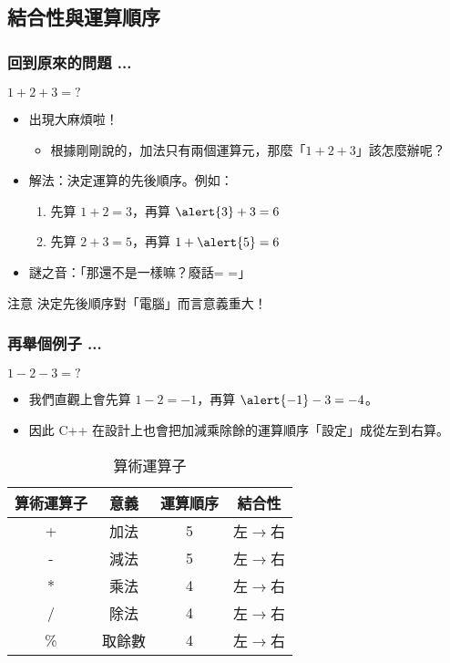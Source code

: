 \documentclass[utf8]{beamer}
\begin{document}
\begin{CJK}{UTF8}{bkai}
\subsection{結合性與運算順序}

\begin{frame}
  \frametitle{回到原來的問題 ...}
  \begin{exampleblock}{$1+2+3=?$}
    \begin{itemize}
    \item \alert{出現大麻煩啦！}
      \begin{itemize}[<2->]
        \item 根據剛剛說的，加法只有兩個運算元，那麼「$1+2+3$」該怎麼辦呢？
      \end{itemize}
    \item<3-> 解法：決定運算的先後順序。例如：
      \begin{enumerate}
        \item<4-> 先算 $1+2=3$，再算 $\alert{3}+3=6$
        \item<5-> 先算 $2+3=5$，再算 $1+\alert{5}=6$
      \end{enumerate}
    \item<6-> 謎之音：「那還不是一樣嘛？廢話= =」
    \end{itemize}
  \end{exampleblock}
  \begin{alertblock}{注意}
  決定先後順序對「電腦」而言\alert{意義重大}！
  \end{alertblock}
\end{frame}

\begin{frame}
  \frametitle{再舉個例子 ...}
  \begin{exampleblock}{$1-2-3=?$}
    \begin{itemize}
    \item<1-> 我們直觀上會先算 $1-2=-1$，再算 $\alert{-1}-3=-4$。
    \item<2-> 因此 C++ 在設計上也會把加減乘除餘的運算順序「設定」成\alert{從左到右算}。
    \end{itemize}
  \end{exampleblock}
  \pause\pause
  \begin{table}[h]
  \begin{tabular}{|c|c|c|c|}
  \hline
  算術運算子  & 意義 & 運算順序 & 結合性\\
  \hline
  +         & 加法 & 5       & 左$\rightarrow$右\\
  \hline
  -         & 減法 & 5       & 左$\rightarrow$右\\
  \hline
  *         & 乘法 & 4       & 左$\rightarrow$右\\
  \hline
  /         & 除法 & 4       & 左$\rightarrow$右\\
  \hline
  \%        & 取餘數 & 4       & 左$\rightarrow$右\\
  \hline
  \end{tabular}
  \caption{算術運算子}
  \end{table}
\end{frame}


\end{CJK}
\end{document}
